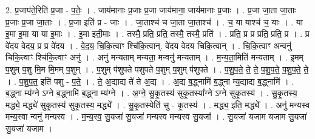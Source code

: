 \documentclass[17pt]{extarticle}
\begin{document}
2. प्र॒जाप॑ते॒रिति॑ प्र॒जा - प॒तेः॒ । . जाय॑मानाः प्र॒जाः प्र॒जा जाय॑माना॒ जाय॑मानाः प्र॒जाः । . प्र॒जा जा॒ता जा॒ताः प्र॒जाः प्र॒जा जा॒ताः । . प्र॒जा इति॑ प्र - जाः । . जा॒ताश्च॑ च जा॒ता जा॒ताश्च॑ । . च॒ या याश्च॑ च॒ याः । . या इ॒मा इ॒मा या या इ॒माः । . इ॒मा इती॒माः । . तस्मै॒ प्रति॒ प्रति॒ तस्मै॒ तस्मै॒ प्रति॑ । . प्रति॒ प्र प्र प्रति॒ प्रति॒ प्र । . प्र वे॑दय वेदय॒ प्र प्र वे॑दय । . वे॒द॒य॒ चि॒कि॒त्वाꣳ श्चि॑कि॒त्वान्. वे॑दय वेदय चिकि॒त्वान् । . चि॒कि॒त्वाꣳ अन्वनु॑ चिकि॒त्वाꣳ श्चि॑कि॒त्वाꣳ अनु॑ । . अनु॑ मन्यताम् मन्यता॒ मन्वनु॑ मन्यताम् । . म॒न्य॒ता॒मिति॑ मन्यताम् । . इ॒मम् प॒शुम् प॒शु मि॒म मि॒मम् प॒शुम् । . प॒शुम् प॑शुपते पशुपते प॒शुम् प॒शुम् प॑शुपते । . प॒शु॒प॒ते॒ ते॒ ते॒ प॒शु॒प॒ते॒ प॒शु॒प॒ते॒ ते॒ । . प॒शु॒प॒त॒ इति॑ पशु - प॒ते॒ । . ते॒ अ॒द्याद्य ते॑ ते अ॒द्य । . अ॒द्य ब॒द्ध्नामि॑ ब॒द्ध्ना म्य॒द्याद्य ब॒द्ध्नामि॑ । . ब॒द्ध्ना म्य॑ग्ने ऽग्ने ब॒द्ध्नामि॑ ब॒द्ध्ना म्य॑ग्ने । . अ॒ग्ने॒ सु॒कृ॒तस्य॑ सुकृ॒तस्या᳚ग्ने ऽग्ने सुकृ॒तस्य॑ । . सु॒कृ॒तस्य॒ मद्ध्ये॒ मद्ध्ये॑ सुकृ॒तस्य॑ सुकृ॒तस्य॒ मद्ध्ये᳚ । . सु॒कृ॒तस्येति॑ सु - कृ॒तस्य॑ । . मद्ध्य॒ इति॒ मद्ध्ये᳚ । . अनु॑ मन्यस्व मन्य॒स्वा न्वनु॑ मन्यस्व । . म॒न्य॒स्व॒ सु॒यजा॑ सु॒यजा॑ मन्यस्व मन्यस्व सु॒यजा᳚ । . सु॒यजा॑ यजाम यजाम सु॒यजा॑ सु॒यजा॑ यजाम । \newline
\end{document}
